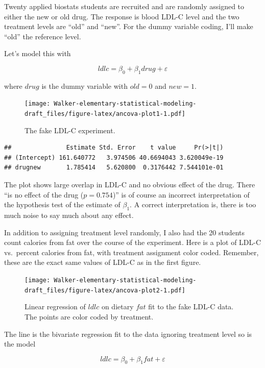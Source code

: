 \documentclass[]{book}
\begin{document}
Twenty applied biostats students are recruited and are randomly assigned
to either the new or old drug. The response is blood LDL-C level and the
two treatment levels are ``old'' and ``new''. For the dummy variable
coding, I'll make ``old'' the reference level.

Let's model this with

\begin{equation}
ldlc = \beta_0 + \beta_1 drug + \varepsilon
\label{eq:ancova-1}
\end{equation}

where \(drug\) is the dummy variable with \(old=0\) and \(new=1\).

\begin{figure}
\centering
\texttt{[image: Walker-elementary-statistical-modeling-draft\_files/figure-latex/ancova-plot1-1.pdf]}
\caption{\label{fig:ancova-plot1}The fake LDL-C experiment.}
\end{figure}

\begin{verbatim}
##               Estimate Std. Error    t value     Pr(>|t|)
## (Intercept) 161.640772   3.974506 40.6694043 3.620049e-19
## drugnew       1.785414   5.620800  0.3176442 7.544101e-01
\end{verbatim}

The plot shows large overlap in LDL-C and no obvious effect of the drug.
There ``is no effect of the drug (\(p = 0.754\))'' is of course an
incorrect interpretation of the hypothesis test of the estimate of
\(\beta_1\). A correct interpretation is, there is too much noise to say
much about any effect.

In addition to assigning treatment level randomly, I also had the 20
students count calories from fat over the course of the experiment. Here
is a plot of LDL-C vs.~percent calories from fat, with treatment
assignment color coded. Remember, these are the exact same values of
LDL-C as in the first figure.

\begin{figure}
\centering
\texttt{[image: Walker-elementary-statistical-modeling-draft\_files/figure-latex/ancova-plot2-1.pdf]}
\caption{\label{fig:ancova-plot2}Linear regression of \(ldlc\) on dietary
\(fat\) fit to the fake LDL-C data. The points are color coded by
treatment.}
\end{figure}

The line is the bivariate regression fit to the data ignoring treatment
level so is the model

\begin{equation}
ldlc = \beta_0 + \beta_1 fat + \varepsilon
\label{eq:ancova-2}
\end{equation}
\end{document}
